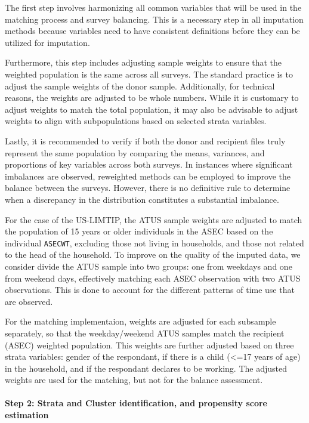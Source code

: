 \documentclass[
  11pt,
]{article}
\let\oldparagraph\paragraph
\renewcommand{\paragraph}[1]{\oldparagraph{#1}\mbox{}}
\begin{document}
The first step involves harmonizing all common variables that will be
used in the matching process and survey balancing. This is a necessary
step in all imputation methods because variables need to have consistent
definitions before they can be utilized for imputation.

Furthermore, this step includes adjusting sample weights to ensure that
the weighted population is the same across all surveys. The standard
practice is to adjust the sample weights of the donor sample.
Additionally, for technical reasons, the weights are adjusted to be
whole numbers. While it is customary to adjust weights to match the
total population, it may also be advisable to adjust weights to align
with subpopulations based on selected strata variables.

Lastly, it is recommended to verify if both the donor and recipient
files truly represent the same population by comparing the means,
variances, and proportions of key variables across both surveys. In
instances where significant imbalances are observed, reweighted methods
can be employed to improve the balance between the surveys. However,
there is no definitive rule to determine when a discrepancy in the
distribution constitutes a substantial imbalance.

For the case of the US-LIMTIP, the ATUS sample weights are adjusted to
match the population of 15 years or older individuals in the ASEC based
on the individual \texttt{ASECWT}, excluding those not living in
households, and those not related to the head of the household. To
improve on the quality of the imputed data, we consider divide the ATUS
sample into two groups: one from weekdays and one from weekend days,
effectively matching each ASEC observation with two ATUS observations.
This is done to account for the different patterns of time use that are
observed.

For the matching implementaion, weights are adjusted for each subsample
separately, so that the weekday/weekend ATUS samples match the recipient
(ASEC) weighted population. This weights are further adjusted based on
three strata variables: gender of the respondant, if there is a child
(\textless=17 years of age) in the household, and if the respondant
declares to be working. The adjusted weights are used for the matching,
but not for the balance assessment.

\paragraph{Step 2: Strata and Cluster identification, and propensity
score
estimation}\label{step-2-strata-and-cluster-identification-and-propensity-score-estimation}
\end{document}
